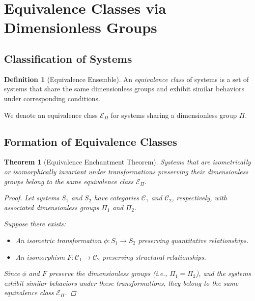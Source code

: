 \documentclass{article}
\newtheorem{theorem}{Theorem}[section]
\theoremstyle{definition}
\newtheorem{definition}{Definition}[section]
\theoremstyle{remark}
\begin{document}
	
	\section{Equivalence Classes via Dimensionless Groups}
	
	\subsection{Classification of Systems}
	
	\begin{definition}[Equivalence Ensemble]
		An \emph{equivalence class} of systems is a set of systems that share the same dimensionless groups and exhibit similar behaviors under corresponding conditions.
		
		We denote an equivalence class $\mathcal{E}_\Pi$ for systems sharing a dimensionless group $\Pi$.
	\end{definition}
	
	\subsection{Formation of Equivalence Classes}
	
	\begin{theorem}[Equivalence Enchantment Theorem]
		Systems that are isometrically or isomorphically invariant under transformations preserving their dimensionless groups belong to the same equivalence class $\mathcal{E}_\Pi$.
		
		\begin{proof}
			Let systems $S_1$ and $S_2$ have categories $\mathcal{C}_1$ and $\mathcal{C}_2$, respectively, with associated dimensionless groups $\Pi_1$ and $\Pi_2$.
			
			Suppose there exists:
			\begin{itemize}
				\item An isometric transformation $\phi: S_1 \rightarrow S_2$ preserving quantitative relationships.
				\item An isomorphism $F: \mathcal{C}_1 \rightarrow \mathcal{C}_2$ preserving structural relationships.
			\end{itemize}
			
			Since $\phi$ and $F$ preserve the dimensionless groups (i.e., $\Pi_1 = \Pi_2$), and the systems exhibit similar behaviors under these transformations, they belong to the same equivalence class $\mathcal{E}_\Pi$.
		\end{proof}
	\end{theorem}
	
\end{document}
